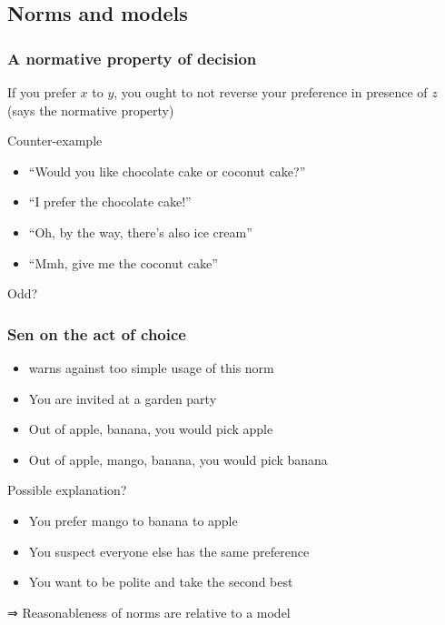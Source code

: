 \documentclass[french,english]{beamer}
\begin{document}
\subsection{Norms and models}
\begin{frame}
	\frametitle{A normative property of decision}
	If you prefer $x$ to $y$, you ought to not reverse your preference in presence of $z$ (says the normative property)
	\begin{block}{Counter-example}
		\begin{itemize}
			\item “Would you like chocolate cake or coconut cake?”
			\item “I prefer the chocolate cake!”
			\item “Oh, by the way, there’s also ice cream”
			\item “Mmh, give me the coconut cake”
		\end{itemize}
	\end{block}
	Odd?
\end{frame}

\begin{frame}
	\frametitle{Sen on the act of choice}
	\begin{itemize}
		\item \citet{sen_maximization_1997} warns against too simple usage of this norm
		\item You are invited at a garden party
		\item Out of {apple, banana}, you would pick apple
		\item Out of {apple, mango, banana}, you would pick banana
	\end{itemize}
	Possible explanation? \pause
	\begin{itemize}
		\item You prefer mango to banana to apple
		\item You suspect everyone else has the same preference
		\item You want to be polite and take the second best
	\end{itemize}
	⇒ Reasonableness of norms are relative to a model
\end{frame}
\end{document}
